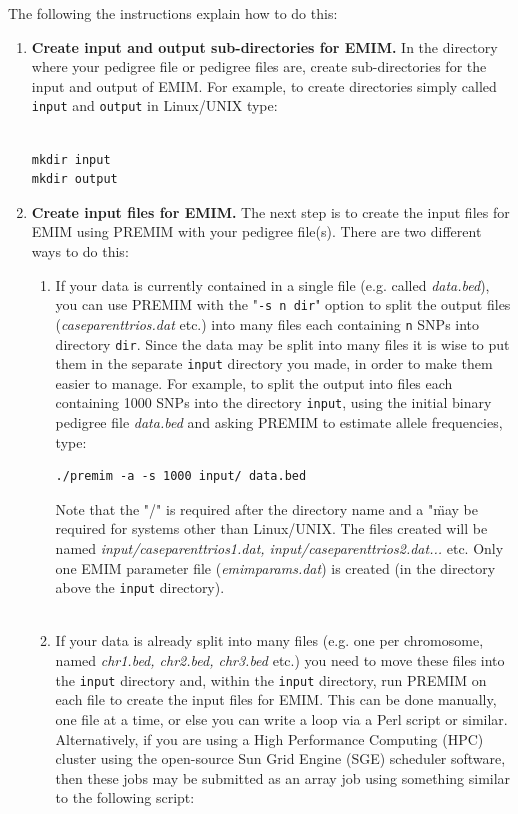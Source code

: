 \documentclass[a4paper,12pt]{article}
\newcommand{\code}[1]{{\footnotesize{{\tt #1}}}}
\begin{document}
The following the instructions explain how to do this: 
\begin{enumerate}

\item {\bf Create input and output sub-directories for EMIM.} In the directory where your pedigree file or pedigree files are, create sub-directories for the input and output of EMIM. For example, to create directories simply called \code{input} and \code{output} in Linux/UNIX type: \vspace{0.35cm} \begin{lstlisting}

mkdir input
mkdir output

\end{lstlisting} \vspace{0.35cm}
\item {\bf Create input files for EMIM.} The next step is to create the input files for EMIM using PREMIM with your pedigree file(s). There are two different ways to do this: \begin{enumerate}

\item If your data is currently contained in a single file (e.g. called {\it data.bed}), you can use PREMIM with the "\code{-s n dir}" option to split the output files ({\it caseparenttrios.dat} etc.) into many files each containing \code{n} SNPs into directory \code{dir}. Since the data may be split into many files it is wise to put them in the separate \code{input} directory you made, in order to make them easier to manage. For example, to split the output into files each containing 1000 SNPs into the directory \code{input}, using the initial binary pedigree file {\it data.bed} and asking PREMIM to estimate allele frequencies, type: \vspace{0.35cm} \begin{lstlisting}
./premim -a -s 1000 input/ data.bed 
\end{lstlisting} \vspace{0.35cm}Note that the "/" is required after the directory name and a "\" may be required for systems other than Linux/UNIX. The files created will be named {\it input/caseparenttrios1.dat, input/caseparenttrios2.dat...} etc. Only one EMIM parameter file ({\it emimparams.dat}) is created (in the directory above the \code{input} directory). \\\\
\item If your data is already split into many files (e.g. one per chromosome, named {\it chr1.bed, chr2.bed, chr3.bed} etc.) you need to move these files into the \code{input} directory and, within the \code{input} directory, run PREMIM on each file to create the input files for EMIM. This can be done manually, one file at a time, or else you can write a loop via a Perl script or similar. Alternatively, if you are using a High Performance Computing (HPC) cluster using the open-source Sun Grid Engine (SGE) scheduler software, then these jobs may be submitted as an array job using something similar to the following script: \vspace{0.35cm} \begin{lstlisting}


\end{lstlisting}
\end{enumerate}
\end{enumerate}
\end{document}
